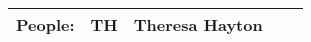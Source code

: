\documentclass[10pt]{article}
\begin{document}
\begin{center}
\vspace{1em}
\begin{tabular}{|c|c|c|c|c|}\hline
{\bf People: } &
TH & Theresa Hayton & &  \\%
     \hline
  \end{tabular}
\end{center}
\end{document}
